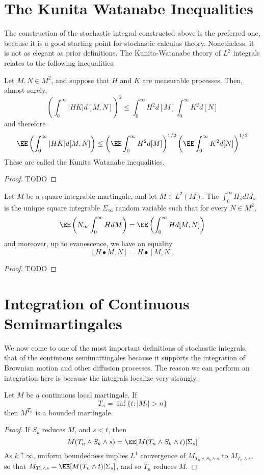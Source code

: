 \section{The Kunita Watanabe Inequalities}

The construction of the stochastic integral constructed above is the preferred one, because it is a good starting point for stochastic calculus theory. Nonetheless, it is not as elegant as prior definitions. The Kunita-Watanabe theory of $L^2$ integrals relates to the following inequalities.

\begin{theorem}
    Let $M,N \in M^2$, and suppose that $H$ and $K$ are measurable processes. Then, almost surely,
    \[ \left( \int_0^\infty |HK| d[M,N] \right)^2 \leq \int_0^\infty H^2 d[M] \int_0^\infty K^2 d[N] \]
    and therefore
    \[ \EE \left( \int_0^\infty |HK| d[M,N] \right) \leq \left( \EE \int_0^\infty H^2 d[M] \right)^{1/2} \left( \EE \int_0^\infty K^2 d[N] \right)^{1/2} \]
    These are called the Kunita Watanabe inequalities.
\end{theorem}
\begin{proof}
    TODO
\end{proof}

\begin{theorem}
    Let $M$ be a square integrable martingale, and let $M \in L^2(M)$. The $\int_0^\infty H_s dM_s$ is the unique square integrable $\Sigma_\infty$ random variable such that for every $N \in M^2$,
    \[ \EE \left( N_\infty \int_0^\infty H dM \right) = \EE \left( \int_0^\infty H d[M,N] \right) \]
    and moreover, up to evanescence, we have an equality
    \[ [H \bullet M, N] = H \bullet [M,N] \]
\end{theorem}
\begin{proof}
    TODO
\end{proof}

\section{Integration of Continuous Semimartingales}

We now come to one of the most important definitions of stochastic integrals, that of the continuous semimartingales because it supports the integration of Brownian motion and other diffusion processes. The reason we can perform an integration here is because the integrals localize very strongly.

\begin{lemma}
    Let $M$ be a continuous local martingale. If
    \[ T_n = \inf \{ t : |M_t| > n \} \]
    then $M^{T_n}$ is a bounded martingale.
\end{lemma}
\begin{proof}
    If $S_k$ reduces $M$, and $s < t$, then
    \[ M(T_n \wedge S_k \wedge s) = \EE[M(T_n \wedge S_k \wedge t) | \Sigma_s] \]
    As $k \uparrow \infty$, uniform boundedness implies $L^1$ convergence of $M_{T_n \wedge S_k \wedge s}$ to $M_{T_n \wedge s}$, so that $M_{T_n \wedge s} = \EE[M(T_n \wedge t)|\Sigma_s]$, and so $T_n$ reduces $M$.
\end{proof}

